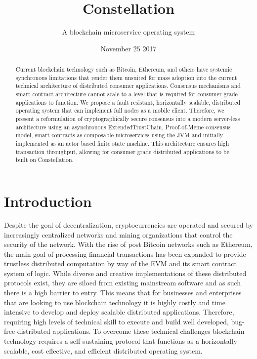 \documentclass{article}
\title{Constellation}
\author{A blockchain microservice operating system}
\date{November 25 2017}
\begin{document}
\maketitle

\begin{abstract}
Current blockchain technology such as Bitcoin, Ethereum, and others have systemic synchronous limitations that render them unsuited for mass adoption into the current technical architecture of distributed consumer applications. Consensus mechanisms and smart contract architecture cannot scale to a level that is required for consumer grade applications to function. We propose a fault resistant, horizontally scalable, distributed operating system that can implement full nodes as a mobile client. Therefore, we present a reformulation of cryptographically secure consensus into a modern server-less architecture using an asynchronous ExtendedTrustChain, Proof-of-Meme consensus model,  smart contracts as composable microservices using the JVM and initially implemented as an actor based finite state machine. This architecture ensures high transaction throughput, allowing for consumer grade distributed applications to be built on Constellation. \

\end{abstract}
\setcounter{secnumdepth}{0}
\section{Introduction}
Despite the goal of decentralization, cryptocurrencies are operated and secured by increasingly centralized networks and mining organizations that control the security of the network. With the rise of post Bitcoin networks such as Ethereum, the main goal of processing financial transactions has been expanded to provide trustless distributed computation by way of the EVM and its smart contract system of logic. While diverse and creative implementations of these distributed protocols exist, they are siloed from existing mainstream software and as such there is a high barrier to entry. This means that for businesses and enterprises that are looking to use blockchain technology it is highly costly and time intensive to develop and deploy scalable distributed applications. Therefore, requiring high levels of technical skill to execute and build well developed, bug-free distributed applications. To overcome these technical challenges blockchain technology requires a self-sustaining protocol that functions as a horizontally scalable, cost effective, and efficient distributed operating system.
\end{document}
